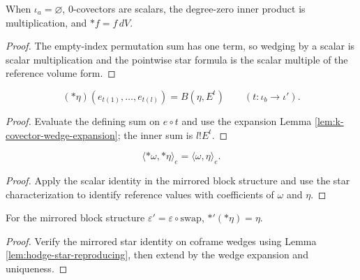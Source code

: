 \begin{proposition}
\label{prop:hodge-star-degree-zero}
\leanok
{}
When $\iota_a=\varnothing$, $0$-covectors are scalars, the degree-zero inner product is multiplication, and $*f=f\,dV$.
\end{proposition}
\begin{proof}
\leanok
\sketch The empty-index permutation sum has one term, so wedging by a scalar is scalar multiplication and the pointwise star formula is the scalar multiple of the reference volume form.
\end{proof}

\begin{lemma}
\label{lem:hodge-star-reproducing}
\leanok
{}
\[
({*}\eta)(e_{t(1)},\ldots,e_{t(l)})=B(\eta,E^t)\qquad(t:\iota_b\to\iota').
\]
\end{lemma}
\begin{proof}
\leanok
\sketch Evaluate the defining sum on $e\circ t$ and use the expansion Lemma \ref{lem:k-covector-wedge-expansion}; the inner sum is $l!E^t$.
\end{proof}

\begin{proposition}
\label{prop:hodge-star-isometry}
\leanok
{}
\[
\langle {*}\omega,{*}\eta\rangle_e=\langle\omega,\eta\rangle_e.
\]
\end{proposition}
\begin{proof}
\leanok
\sketch Apply the scalar identity in the mirrored block structure and use the star characterization to identify reference values with coefficients of $\omega$ and $\eta$.
\end{proof}

\begin{proposition}
\label{prop:hodge-star-involution}
\leanok
{}
For the mirrored block structure $\varepsilon'=\varepsilon\circ\mathrm{swap}$, $*'(*\eta)=\eta$.
\end{proposition}
\begin{proof}
\leanok
\sketch Verify the mirrored star identity on coframe wedges using Lemma \ref{lem:hodge-star-reproducing}, then extend by the wedge expansion and uniqueness.
\end{proof}

